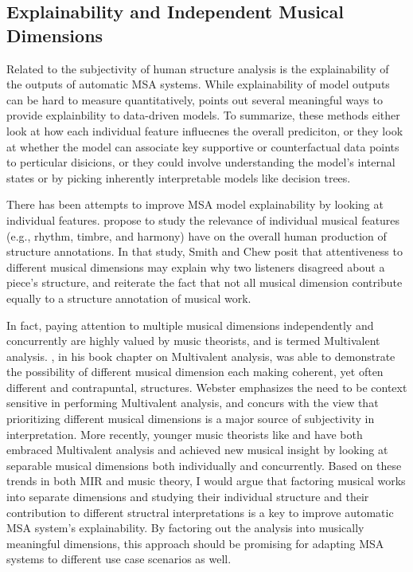 \subsection{Explainability and Independent Musical Dimensions}
Related to the subjectivity of human structure analysis is the explainability of the outputs of automatic MSA systems.
While explainability of model outputs can be hard to measure quantitatively, \cite{molnar2019} points out several meaningful ways to provide explainbility to data-driven models.
To summarize, these methods either look at how each individual feature influecnes the overall prediciton, or they look at whether the model can associate key supportive or counterfactual data points to perticular disicions, or they could involve understanding the model's internal states or by picking inherently interpretable models like decision trees.

There has been attempts to improve MSA model explainability by looking at individual features.
\cite{smith2013quadratic} propose to study the relevance of individual musical features (e.g., rhythm, timbre, and harmony) have on the overall human production of structure annotations.
In that study, Smith and Chew posit that attentiveness to different musical dimensions may explain why two listeners disagreed about a piece's structure, and reiterate the fact that not all musical dimension contribute equally to a structure annotation of musical work.

In fact, paying attention to multiple musical dimensions independently and concurrently are highly valued by music theorists, and is termed Multivalent analysis.
\cite{webster2009multivalent}, in his book chapter on Multivalent analysis, was able to demonstrate the possibility of different musical dimension each making coherent, yet often different and contrapuntal, structures.
Webster emphasizes the need to be context sensitive in performing Multivalent analysis, and concurs with the view that prioritizing different musical dimensions is a major source of subjectivity in interpretation.
More recently, younger music theorists like \cite{brody2016parametric} and \cite{yust2018organized} have both embraced Multivalent analysis and achieved new musical insight by looking at separable musical dimensions both individually and concurrently.
Based on these trends in both MIR and music theory, I would argue that factoring musical works into separate dimensions and studying their individual structure and their contribution to different structral interpretations is a key to improve automatic MSA system's explainability.
By factoring out the analysis into musically meaningful dimensions, this approach should be promising for adapting MSA systems to different use case scenarios as well.

